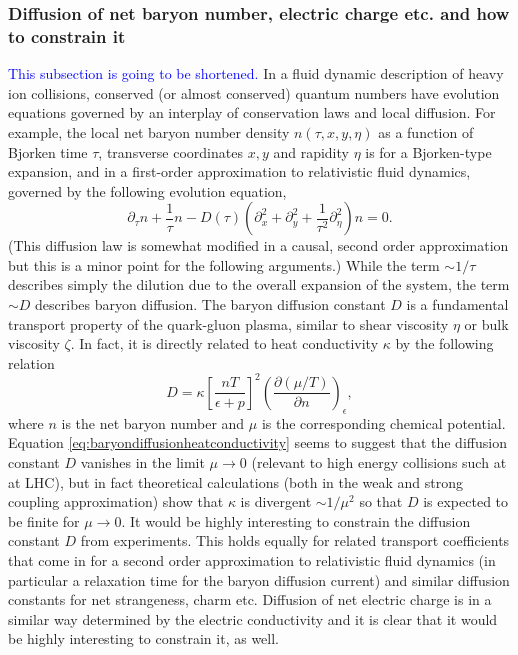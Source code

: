 \subsubsection{Diffusion of net baryon number, electric charge etc. and how to constrain it}
\textcolor{blue}{This subsection is  going to be shortened.}
In a fluid dynamic description of heavy ion collisions, conserved (or almost conserved) quantum numbers have evolution equations governed by an interplay of conservation laws and local diffusion. For example, the local net baryon number density $n(\tau, x, y, \eta)$ as a function of Bjorken time $\tau$, transverse coordinates $x,y$ and rapidity $\eta$ is for a Bjorken-type expansion, and in a first-order approximation to relativistic fluid dynamics, governed by the following evolution equation,
\begin{equation}
\partial_\tau n + \frac{1}{\tau}n - D(\tau) \left( \partial_x^2 + \partial_y^2 + \frac{1}{\tau^2} \partial_\eta^2 \right) n =0.
\end{equation}
(This diffusion law is somewhat modified in a causal, second order approximation but this is a minor point for the following arguments.) While the term $\sim 1/ \tau$ describes simply the dilution due to the overall expansion of the system, the term $\sim D$ describes baryon diffusion. The baryon diffusion constant $D$ is a fundamental transport property of the quark-gluon plasma, similar to shear viscosity $\eta$ or bulk viscosity $\zeta$. In fact, it is directly related to heat conductivity $\kappa$ by the following relation
\begin{equation}
D = \kappa \left[ \frac{nT}{\epsilon + p} \right]^2 \left( \frac{\partial (\mu/T)}{\partial n} \right)_\epsilon,
\label{eq:baryondiffusionheatconductivity}
\end{equation}
where $n$ is the net baryon number and $\mu$ is the corresponding chemical potential. Equation \eqref{eq:baryondiffusionheatconductivity} seems to suggest that the diffusion constant $D$ vanishes in the limit $\mu\to 0$ (relevant to high energy collisions such at at LHC), but in fact theoretical calculations (both in the weak and strong coupling approximation) show that $\kappa$ is divergent $\sim 1/\mu^2$ so that $D$ is expected to be finite for $\mu\to 0$. It would be highly interesting to constrain the diffusion constant $D$ from experiments. This holds equally for related transport coefficients that come in for a second order approximation to relativistic fluid dynamics (in particular a relaxation time for the baryon diffusion current) and similar diffusion constants for net strangeness, charm etc. Diffusion of net electric charge is in a similar way determined by the electric conductivity and it is clear that it would be highly interesting to constrain it, as well.

